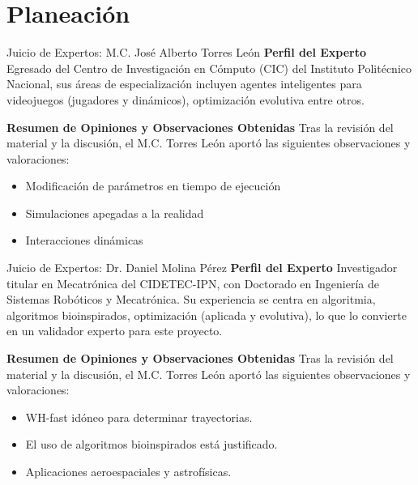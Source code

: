 \section{Planeación}

\begin{frame}{Juicio de Expertos: M.C. José Alberto Torres León}
  \textbf{Perfil del Experto}
  \RaggedRight%
  \scriptsize
  Egresado del Centro de Investigación en Cómputo (CIC) del Instituto Politécnico Nacional, sus áreas de especialización
  incluyen agentes inteligentes para videojuegos (jugadores y dinámicos), optimización evolutiva entre otros.

  \bigskip

  \textbf{Resumen de Opiniones y Observaciones Obtenidas}
  \RaggedRight%
  \scriptsize
  Tras la revisión del material y la discusión, el M.C. Torres León aportó las siguientes observaciones y valoraciones:
  \begin{itemize}
    \item Modificación de parámetros en tiempo de ejecución
    \item Simulaciones apegadas a la realidad
    \item Interacciones dinámicas
  \end{itemize}
\end{frame}

\begin{frame}{Juicio de Expertos: Dr. Daniel Molina Pérez}
  \textbf{Perfil del Experto}
  \RaggedRight
  \scriptsize
  Investigador titular en Mecatrónica del CIDETEC-IPN, con Doctorado en Ingeniería de Sistemas Robóticos y Mecatrónica. Su experiencia se centra en algoritmia, algoritmos bioinspirados, optimización (aplicada y evolutiva), lo que lo convierte en un validador experto para este proyecto.

  \bigskip

  \textbf{Resumen de Opiniones y Observaciones Obtenidas}
  \RaggedRight
  \scriptsize
  Tras la revisión del material y la discusión, el M.C. Torres León aportó las siguientes observaciones y valoraciones:
  \begin{itemize}
    \item WH-fast idóneo para determinar trayectorias.
    \item El uso de algoritmos bioinspirados está justificado.
    \item Aplicaciones aeroespaciales y astrofísicas.
  \end{itemize}
\end{frame}

